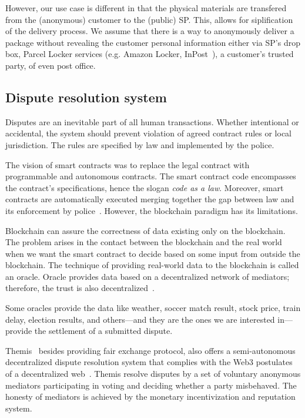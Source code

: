 However, our use case is different in that the physical materials are transfered from the (anonymous) customer to the (public) SP. This, allows for siplification of the delivery process. We assume that there is a way to anonymously deliver a package without revealing the customer personal information either via SP's drop box, Parcel Locker services (e.g. Amazon Locker, InPost~\cite{inpostParcelLockerService}), a customer's trusted party, of even post office.

\subsection{Dispute resolution system}
\label{sec:dispute-resolution}

Disputes are an inevitable part of all human transactions. Whether intentional or accidental, the system should prevent violation of agreed contract rules or local jurisdiction. The rules are specified by law and implemented by the police.

The vision of smart contracts was to replace the legal contract with
programmable and autonomous contracts. The smart contract code encompasses the contract's specifications, hence the slogan \textit{code as a law}. Moreover, smart contracts are automatically executed merging together the gap between law and its enforcement by police~\cite{allenGovernanceBlockchainDispute2019}. However, the blockchain paradigm has its limitations. 
 
Blockchain can assure the correctness of data existing only on the blockchain. The problem arises in the contact between the blockchain and the real world when we want the smart contract to decide based on some input from outside the blockchain. The technique of providing real-world data to the blockchain is called an oracle. Oracle provides data based on a decentralized network of mediators; therefore, the trust is also decentralized~\cite{breidenbachChainlinkNextSteps2021}.

Some oracles provide the data like weather, soccer match result, stock
price, train delay, election results, and others—and they are the ones we
are interested in—provide the settlement of a submitted dispute.

Themis~\cite{mengThemisDecentralizedEscrow2019} besides providing fair exchange protocol,
also offers a semi-autonomous decentralized dispute resolution system that complies with the Web3 postulates of a decentralized web~\cite{ethereumWhatWeb3Why}. Themis resolve disputes by a set of voluntary anonymous mediators participating in voting and deciding whether a party misbehaved. The honesty of mediators is achieved by the monetary incentivization and reputation system.


